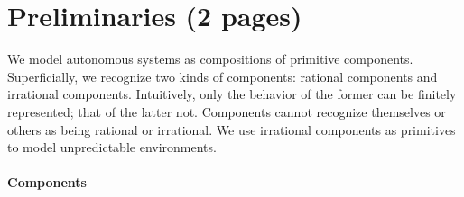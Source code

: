\section{Preliminaries (2 pages)}


We model autonomous systems as compositions of primitive components.
Superficially, we recognize two kinds of components: rational components and irrational components.
Intuitively, only the behavior of the former can be finitely represented; that of the latter not.
Components cannot recognize themselves or others as being rational or irrational.
We use irrational components as primitives to model unpredictable environments.

\paragraph{Components}

